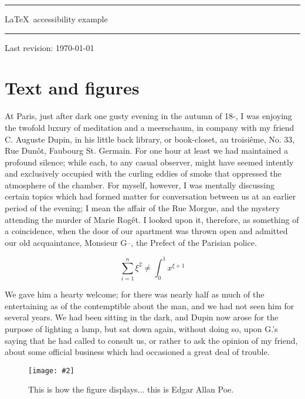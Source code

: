 \documentclass[a4paper,17pt]{extbook} %
\newcommand{\IncludeGraphics}[2]{\texttt{[image: \#2]}}
\newcommand{\IncludeGraphics}[2]{\texttt{[image: \#2]}}
\begin{document}
\ifzoom
{} 
\else
\fi


\thispagestyle{empty}
\vfill
\hrule
\vspace{20mm}
\centerline{\Huge \sc \LaTeX\ accessibility example}
\vspace{20mm}
\hrule
\vspace{10mm}
\centerline{\hfill Last revision: \today}
\vfill
\strut
\pagebreak



\chapter{Text and figures}


At Paris, just after dark one gusty evening in the autumn of 18-, I was
enjoying the twofold luxury of meditation and a meerschaum, in company
with my friend C. Auguste Dupin, in his little back library, or
book-closet, au troisiême, No. 33, Rue Dunôt, Faubourg St. Germain. For
one hour at least we had maintained a profound silence; while each, to
any casual observer, might have seemed intently and exclusively occupied
with the curling eddies of smoke that oppressed the atmosphere of the
chamber. For myself, however, I was mentally discussing certain topics
which had formed matter for conversation between us at an earlier period
of the evening; I mean the affair of the Rue Morgue, and the mystery
attending the murder of Marie Rogêt. I looked upon it, therefore, as
something of a coincidence, when the door of our apartment was thrown
open and admitted our old acquaintance, Monsieur G--, the Prefect of the
Parisian police.

\begin{equation}
\sum_{i=1}^n \xi^2 \neq \int_0^1 x^{\xi+1}
\end{equation}

We gave him a hearty welcome; for there was nearly half as much of the
entertaining as of the contemptible about the man, and we had not seen
him for several years. We had been sitting in the dark, and Dupin now
arose for the purpose of lighting a lamp, but sat down again, without
doing so, upon G.'s saying that he had called to consult us, or rather
to ask the opinion of my friend, about some official business which had
occasioned a great deal of trouble.

\begin{figure}[htbp]
\centerline{\IncludeGraphics{height=5cm}{EdgarAllanPoe.jpg}} %
\caption{This is how the figure displays... this is Edgar Allan Poe.\label{fig:example}}
\end{figure}
\end{document}
